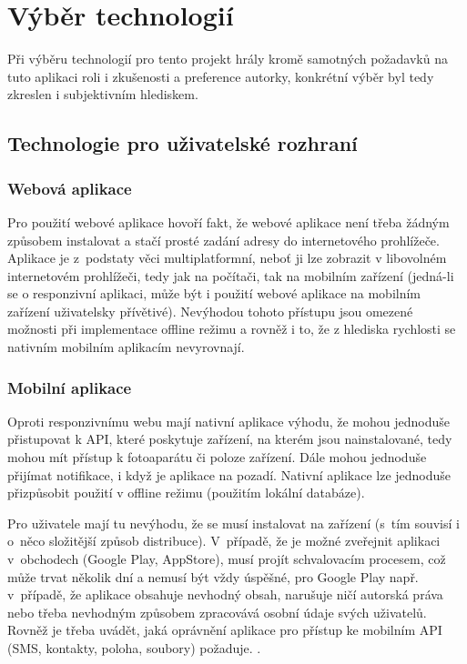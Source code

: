 \documentclass[twoside]{ctuthesis}
\begin{document}


\chapter{Výběr technologií}
Při výběru technologií pro tento projekt hrály kromě samotných požadavků na tuto aplikaci roli i zkušenosti a preference autorky, konkrétní výběr byl tedy zkreslen i subjektivním hlediskem.

\section{Technologie pro uživatelské rozhraní}

\subsection{Webová aplikace}
Pro použití webové aplikace hovoří fakt, že webové aplikace není třeba žádným způsobem instalovat a stačí prosté zadání adresy do internetového prohlížeče. Aplikace je z~podstaty věci multiplatformní, neboť ji lze zobrazit v libovolném internetovém prohlížeči, tedy jak na počítači, tak na mobilním zařízení (jedná-li se o responzivní aplikaci, může být i použití webové aplikace na mobilním zařízení uživatelsky přívětivé). Nevýhodou tohoto přístupu jsou omezené možnosti při implementace offline režimu a rovněž i to, že z hlediska rychlosti se nativním mobilním aplikacím nevyrovnají.


\subsection{Mobilní aplikace}

Oproti responzivnímu webu mají nativní aplikace výhodu, že mohou jednoduše přistupovat k API, které poskytuje zařízení, na kterém jsou nainstalované, tedy mohou mít přístup k fotoaparátu či poloze zařízení. Dále mohou jednoduše přijímat notifikace, i když je aplikace na pozadí. Nativní aplikace lze jednoduše přizpůsobit použití v offline režimu (použitím lokální databáze).

Pro uživatele mají tu nevýhodu, že se musí instalovat na zařízení (s~tím souvisí i o~něco složitější způsob distribuce). V~případě, že je možné zveřejnit aplikaci v~obchodech (Google Play, AppStore), musí projít schvalovacím procesem, což může trvat několik dní a nemusí být vždy úspěšné, pro Google Play např. v~případě, že aplikace obsahuje nevhodný obsah, narušuje ničí autorská práva nebo třeba nevhodným způsobem zpracovává osobní údaje svých uživatelů. Rovněž je třeba uvádět, jaká oprávnění aplikace pro přístup ke mobilním API (SMS, kontakty, poloha, soubory) požaduje. \cite{google2021policy}.
\end{document}
